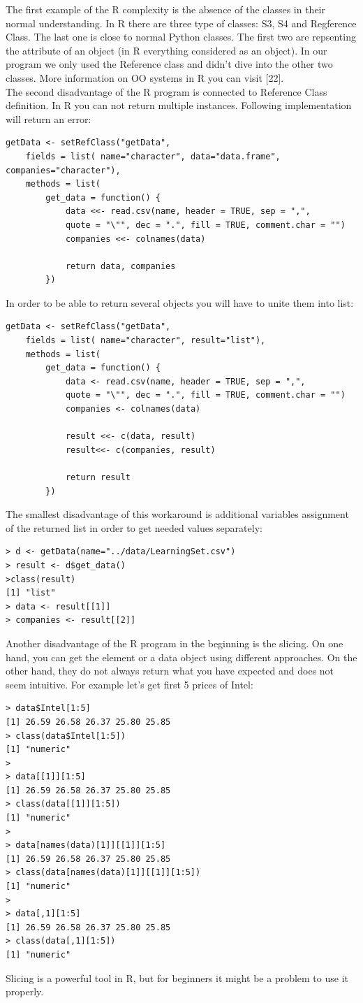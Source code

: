 \documentclass{article}
\begin{document}
The first example of the R complexity is the absence of the classes in their normal understanding. In R there are three type of classes: S3, S4 and Regference Class. The last one is close to normal Python classes. The first two are repsenting the attribute of an object (in R everything considered as an object). In our program we only used the Reference class and didn't dive into the other two classes. More information on OO systems in R you can visit [22]. \\
The second disadvantage of the R program is connected to Reference Class definition. In R you can not return multiple instances. Following implementation will return an error:
\begin{verbatim}
getData <- setRefClass("getData",
    fields = list( name="character", data="data.frame", companies="character"),
	methods = list( 
    	get_data = function() {
            data <<- read.csv(name, header = TRUE, sep = ",", 
            quote = "\"", dec = ".", fill = TRUE, comment.char = "")
			companies <<- colnames(data)
			
			return data, companies
		})
\end{verbatim}
In order to be able to return several objects you will have to unite them into list:
\begin{verbatim}
getData <- setRefClass("getData",
    fields = list( name="character", result="list"),
	methods = list( 
    	get_data = function() {
            data <- read.csv(name, header = TRUE, sep = ",", 
            quote = "\"", dec = ".", fill = TRUE, comment.char = "")
			companies <- colnames(data)
            
            result <<- c(data, result)
            result<<- c(companies, result)
            
            return result            			
		})
\end{verbatim}
The smallest disadvantage of this workaround is additional variables assignment of the returned list in order to get needed values separately:
\begin{verbatim}
> d <- getData(name="../data/LearningSet.csv")
> result <- d$get_data()
>class(result)
[1] "list"
> data <- result[[1]]
> companies <- result[[2]]
\end{verbatim}
Another disadvantage of the R program in the beginning is the slicing. On one hand, you can get the element or a data object using different approaches. On the other hand, they do not always return what you have expected and does not seem intuitive. For example let's get first 5 prices of Intel:
\begin{verbatim}
> data$Intel[1:5]
[1] 26.59 26.58 26.37 25.80 25.85
> class(data$Intel[1:5])
[1] "numeric"
>
> data[[1]][1:5]
[1] 26.59 26.58 26.37 25.80 25.85
> class(data[[1]][1:5])
[1] "numeric"
>
> data[names(data)[1]][[1]][1:5]
[1] 26.59 26.58 26.37 25.80 25.85
> class(data[names(data)[1]][[1]][1:5])
[1] "numeric"
>
> data[,1][1:5]
[1] 26.59 26.58 26.37 25.80 25.85
> class(data[,1][1:5])
[1] "numeric"
\end{verbatim}
Slicing is a powerful tool in R, but for beginners it might be a problem to use it properly.
\end{document}
